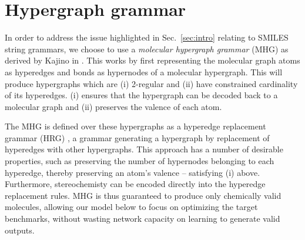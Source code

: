\documentclass{article}
\begin{document}
\section{Hypergraph grammar}\label{sec:grammar}
In order to address the issue highlighted in Sec.~\ref{sec:intro} relating to SMILES string grammars, we choose to use a {\em molecular hypergraph grammar} (MHG) as derived by Kajino in \cite{kajino2018}. This works by first representing the molecular graph atoms as hyperedges and bonds as hypernodes of a molecular hypergraph. This will produce hypergraphs which are (i) 2-regular and (ii) have constrained cardinality of its hyperedges. (i) ensures that the hypergraph can be decoded back to a molecular graph and (ii) preserves the valence of each atom.

The MHG is defined over these hypergraphs as a hyperedge replacement grammar (HRG) \cite{drewes1997}, a grammar generating a hypergraph by replacement of hyperedges with other hypergraphs. This approach has a number of desirable properties, such as preserving the number of hypernodes belonging to each hyperedge, thereby preserving an atom's valence -- satisfying (i) above. Furthermore, stereochemisty can be encoded directly into the hyperedge replacement rules. MHG is thus guaranteed to produce only chemically valid molecules, allowing our model below to focus on optimizing the target benchmarks, without wasting network capacity on learning to generate valid outputs.
\end{document}
